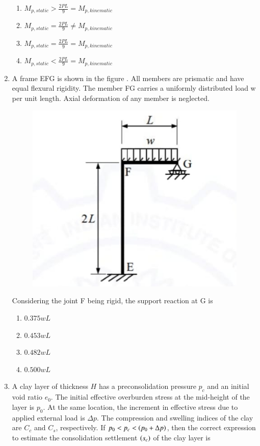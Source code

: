 \documentclass[journal,12pt,onecolumn]{article}
\theoremstyle{remark}
\begin{document}
\begin{enumerate}
\hfill{}

\begin{enumerate}
    \item $M_{p,static} > \frac{2PL}{9} = M_{p,kinematic}$
    \item $M_{p,static} = \frac{2PL}{9} \ne M_{p,kinematic}$
    \item $M_{p,static} = \frac{2PL}{9} = M_{p,kinematic}$
    \item $M_{p,static} < \frac{2PL}{9} = M_{p,kinematic}$
\end{enumerate}

\item A frame EFG is shown in the figure  . All members are prismatic and have equal flexural rigidity. The member FG carries a uniformly distributed load w per unit length. Axial deformation of any member is neglected.
\begin{figure}[H]
    \centering
    \includegraphics[width=0.7\columnwidth]{figs/2q29.jpg}
    \caption{}
    \label{fig:q29}
\end{figure}
Considering the joint F being rigid, the support reaction at G is

\hfill{}

\begin{multicols}{2}
\begin{enumerate}
    \item $0.375 wL$
    \item $0.453 wL$
    \item $0.482 wL$
    \item $0.500 wL$
\end{enumerate}
\end{multicols}

\item A clay layer of thickness $H$ has a preconsolidation pressure $p_c$ and an initial void ratio $e_0$. The initial effective overburden stress at the mid-height of the layer is $p_0$. At the same location, the increment in effective stress due to applied external load is $\Delta p$. The compression and swelling indices of the clay are $C_c$ and $C_s$, respectively. If $p_0 < p_c < \left(p_0 + \Delta p\right)$, then the correct expression to estimate the consolidation settlement $\left(s_c\right)$ of the clay layer is


\end{enumerate}
\end{document}
